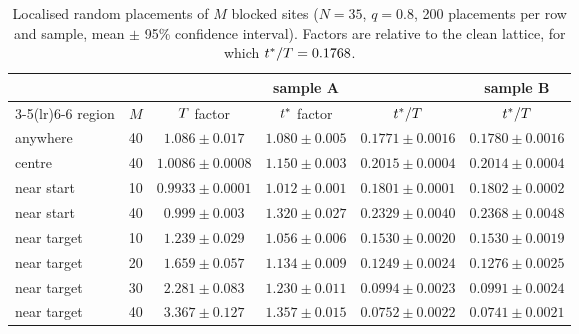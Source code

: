 \begin{table}[tbp]
\centering
\caption{Localised random placements of $M$ blocked sites ($N=35$, $q=0.8$, 200 placements per row and sample,
mean $\pm$ 95\% confidence interval). Factors are relative to the clean lattice, for which $t^{*}/T=0.1768$.}
\label{s8_defects_placement:tab-local}
\small
\begin{tabular}{lrcccc}
\toprule
 & & \multicolumn{3}{c}{sample A} & sample B\\
\cmidrule(lr){3-5}\cmidrule(lr){6-6}
region & $M$ & $T$ factor & $t^{*}$ factor & $t^{*}/T$ & $t^{*}/T$\\
\midrule
anywhere    & 40 & $1.086\pm0.017$   & $1.080\pm0.005$ & $0.1771\pm0.0016$ & $0.1780\pm0.0016$\\
centre      & 40 & $1.0086\pm0.0008$ & $1.150\pm0.003$ & $0.2015\pm0.0004$ & $0.2014\pm0.0004$\\
near start  & 10 & $0.9933\pm0.0001$ & $1.012\pm0.001$ & $0.1801\pm0.0001$ & $0.1802\pm0.0002$\\
near start  & 40 & $0.999\pm0.003$   & $1.320\pm0.027$ & $0.2329\pm0.0040$ & $0.2368\pm0.0048$\\
near target & 10 & $1.239\pm0.029$   & $1.056\pm0.006$ & $0.1530\pm0.0020$ & $0.1530\pm0.0019$\\
near target & 20 & $1.659\pm0.057$   & $1.134\pm0.009$ & $0.1249\pm0.0024$ & $0.1276\pm0.0025$\\
near target & 30 & $2.281\pm0.083$   & $1.230\pm0.011$ & $0.0994\pm0.0023$ & $0.0991\pm0.0024$\\
near target & 40 & $3.367\pm0.127$   & $1.357\pm0.015$ & $0.0752\pm0.0022$ & $0.0741\pm0.0021$\\
\bottomrule
\end{tabular}
\end{table}

